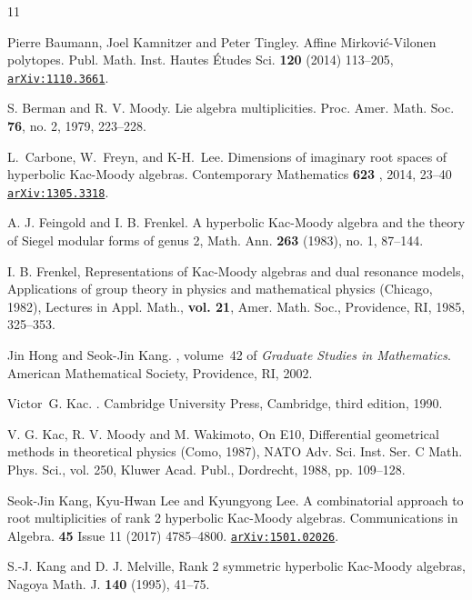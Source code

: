 \documentclass{amsart}
\numberwithin{equation}{section}
\numberwithin{figure}{section}
\numberwithin{table}{section}
\theoremstyle{definition}
\newcommand{\arxiv}[1]{\href{http://arxiv.org/abs/#1}{\tt arXiv:\nolinkurl{#1}}}
\begin{document}
\begin{thebibliography}{11}

Pierre Baumann, Joel Kamnitzer and Peter Tingley. Affine Mirkovi\'c-Vilonen polytopes. { Publ. Math. Inst. Hautes \'Etudes Sci.} {\bf 120} (2014) 113--205, 
\arxiv{1110.3661}.

S. Berman and R. V. Moody. Lie algebra multiplicities. { Proc. Amer. Math. Soc.} {\bf 76}, no. 2, 1979, 223--228.

L.~Carbone, W.~Freyn, and K-H.~Lee.
Dimensions of imaginary root spaces of hyperbolic
Kac-Moody algebras.
{ Contemporary Mathematics}
{\bf 623} , 2014, 23--40
\arxiv{1305.3318}.


A. J. Feingold and I. B. Frenkel. A hyperbolic Kac-Moody algebra and the theory of Siegel modular forms of
genus 2, Math. Ann. {\bf 263} (1983), no. 1, 87–144.

I. B. Frenkel, Representations of Kac-Moody algebras and dual resonance models, Applications of group theory
in physics and mathematical physics (Chicago, 1982), Lectures in Appl. Math., {\bf vol. 21}, Amer. Math. Soc.,
Providence, RI, 1985, 325--353.


Jin Hong and Seok-Jin Kang.
, volume~42 of
  {\em Graduate Studies in Mathematics}.
\newblock American Mathematical Society, Providence, RI, 2002.


Victor~G. Kac.
.
\newblock Cambridge University Press, Cambridge, third edition, 1990.

V. G. Kac, R. V. Moody and M. Wakimoto, On E10, Differential geometrical methods in theoretical physics (Como, 1987), NATO Adv. Sci. Inst. Ser. C Math. Phys. Sci., vol. 250, Kluwer Acad. Publ., Dordrecht, 1988,
pp. 109--128.

Seok-Jin Kang, Kyu-Hwan Lee and Kyungyong Lee. A combinatorial approach to root multiplicities of rank 2 hyperbolic Kac-Moody algebras.
Communications in Algebra.
{\bf 45} Issue 11 (2017) 4785--4800. \arxiv{1501.02026}.

S.-J. Kang and D. J. Melville, Rank 2 symmetric hyperbolic Kac-Moody algebras, Nagoya Math. J. {\bf 140} (1995),
41--75.



\end{thebibliography}
\end{document}
